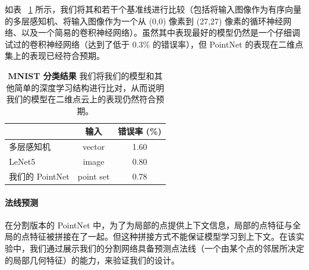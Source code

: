 如表 ~\ref{tab:mnist} 所示，我们将其和若干个基准线进行比较（包括将输入图像作为有序向量的多层感知机、将输入图像作为一个从 (0,0) 像素到 (27,27) 像素的循环神经网络、以及一个简易的卷积神经网络）。虽然其中表现最好的模型仍然是一个仔细调试过的卷积神经网络（达到了低于 $0.3\%$ 的错误率），但 PointNet 的表现在二维点集上的表现已经符合预期。



\begin{table}[h!]
    \centering
    \begin{tabular}[width=\linewidth]{l|c|c}
    \hline
    ~                      & 输入 & 错误率 (\%) \\ \hline
    多层感知机~\cite{simard2003best} & vector & 1.60  \\
    LeNet5~\cite{lecun1998gradient}                 & image & 0.80 \\ \hline
    我们的 PointNet          & point set & 0.78 \\ \hline
    \end{tabular}
    \caption{\textbf{MNIST 分类结果} 我们将我们的模型和其他简单的深度学习结构进行比对，从而说明我们的模型在二维点云上的表现仍然符合预期。
    }
    \label{tab:mnist}
\end{table}


\paragraph{法线预测}
在分割版本的 PointNet 中，为了为局部的点提供上下文信息，局部的点特征与全局的点特征被拼接在了一起。但这种拼接方式不能保证模型学习到上下文。在该实验中，我们通过展示我们的分割网络具备预测点法线（一个由某个点的邻居所决定的局部几何特征）的能力，来验证我们的设计。

